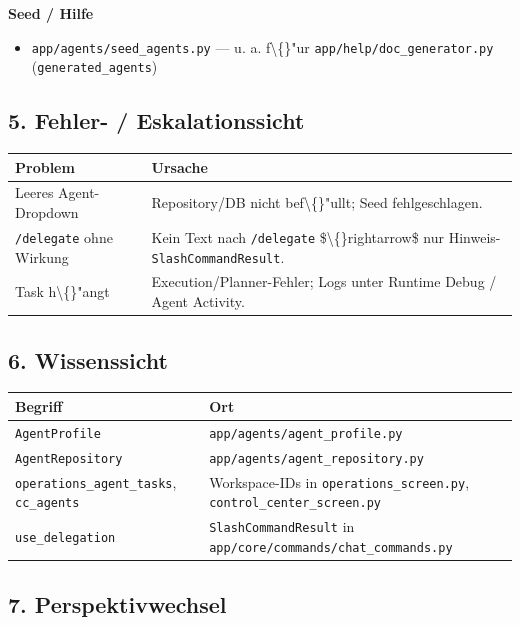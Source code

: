 \textbf{Seed / Hilfe}

\begin{itemize}
\item \texttt{app/agents/seed\_agents.py} --- u. a. f\textbackslash\{\}"ur \texttt{app/help/doc\_generator.py} (\texttt{generated\_agents})
\end{itemize}

\subsection{5. Fehler- / Eskalationssicht}

\begin{center}
\begin{tabular}{ll}
\hline
Problem & Ursache \\
\hline
Leeres Agent-Dropdown & Repository/DB nicht bef\textbackslash\{\}"ullt; Seed fehlgeschlagen. \\
\texttt{/delegate} ohne Wirkung & Kein Text nach \texttt{/delegate} \$\textbackslash\{\}rightarrow\$ nur Hinweis-\texttt{SlashCommandResult}. \\
Task h\textbackslash\{\}"angt & Execution/Planner-Fehler; Logs unter Runtime Debug / Agent Activity. \\
\hline
\end{tabular}
\end{center}

\subsection{6. Wissenssicht}

\begin{center}
\begin{tabular}{ll}
\hline
Begriff & Ort \\
\hline
\texttt{AgentProfile} & \texttt{app/agents/agent\_profile.py} \\
\texttt{AgentRepository} & \texttt{app/agents/agent\_repository.py} \\
\texttt{operations\_agent\_tasks}, \texttt{cc\_agents} & Workspace-IDs in \texttt{operations\_screen.py}, \texttt{control\_center\_screen.py} \\
\texttt{use\_delegation} & \texttt{SlashCommandResult} in \texttt{app/core/commands/chat\_commands.py} \\
\hline
\end{tabular}
\end{center}

\subsection{7. Perspektivwechsel}

